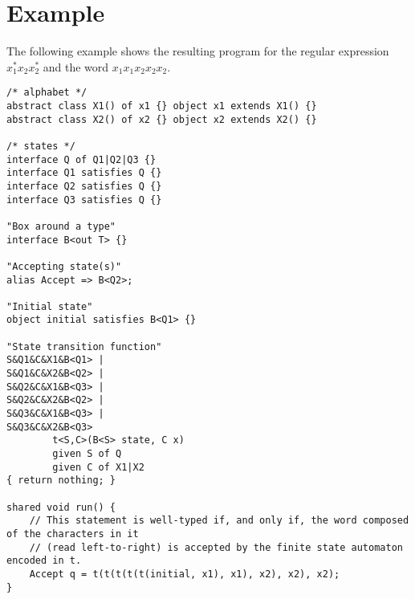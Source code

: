 \documentclass[a4paper, 11pt]{article}
\theoremstyle{definition}
\begin{document}
\section{Example}
The following example shows the resulting program for the regular expression $x_1^\ast x_2 x_2^\ast$ and the word $x_1x_1x_2x_2x_2$.
\begin{verbatim}
/* alphabet */
abstract class X1() of x1 {} object x1 extends X1() {}
abstract class X2() of x2 {} object x2 extends X2() {}

/* states */
interface Q of Q1|Q2|Q3 {}
interface Q1 satisfies Q {}
interface Q2 satisfies Q {}
interface Q3 satisfies Q {}

"Box around a type"
interface B<out T> {}

"Accepting state(s)"
alias Accept => B<Q2>;

"Initial state"
object initial satisfies B<Q1> {}

"State transition function"
S&Q1&C&X1&B<Q1> |
S&Q1&C&X2&B<Q2> |
S&Q2&C&X1&B<Q3> |
S&Q2&C&X2&B<Q2> |
S&Q3&C&X1&B<Q3> |
S&Q3&C&X2&B<Q3>
        t<S,C>(B<S> state, C x)
        given S of Q
        given C of X1|X2
{ return nothing; }

shared void run() {
    // This statement is well-typed if, and only if, the word composed of the characters in it
    // (read left-to-right) is accepted by the finite state automaton encoded in t.
    Accept q = t(t(t(t(t(initial, x1), x1), x2), x2), x2);
}
\end{verbatim}
\end{document}
